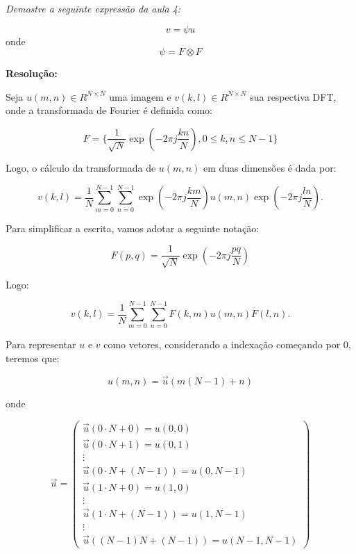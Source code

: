 \documentclass[]{abntex2}
\begin{document}
\textit{Demostre a seguinte expressão da aula 4:}

\begin{equation*}
	v = \psi u
\end{equation*}
onde
\begin{equation*}
	\psi = F \otimes F
\end{equation*}

\textbf{Resolução:}

Seja $u(m,n)\in R^{N \times N}$ uma imagem e $v(k,l)\in R^{N \times N}$ sua respectiva DFT, onde a transformada de Fourier é definida como:

\begin{equation*}
	F=\{\dfrac{1}{\sqrt{N}}\exp(-2\pi j \dfrac{kn}{N}), 0 \leq k,n \leq N-1\}
\end{equation*}

Logo, o cálculo da transformada de $u(m,n)$ em duas dimensões é dada por:

\begin{equation*}
	v(k,l) = \dfrac{1}{N} \sum_{m = 0}^{N-1} \sum_{n = 0}^{N-1} \exp(-2\pi j \dfrac{km}{N}) u(m,n)\exp(-2\pi j \dfrac{ln}{N}).
\end{equation*}

Para simplificar a escrita, vamos adotar a seguinte notação:

\begin{equation*}
	F(p,q) = \dfrac{1}{\sqrt{N}}\exp(-2\pi j \dfrac{pq}{N})
\end{equation*}

Logo:

\begin{equation*}
	v(k,l) = \dfrac{1}{N} \sum_{m = 0}^{N-1} \sum_{n = 0}^{N-1} F(k,m) u(m,n)F(l,n).
\end{equation*}

Para representar $u$ e $v$ como vetores, considerando a indexação começando por $0$, teremos que:

\begin{equation*}
	u(m,n) = \vec{u}(m(N-1)+n)
\end{equation*}

onde

\begin{equation*}
	\vec{u} = \begin{pmatrix}
		\vec{u}(0\cdot N+0) = u(0,0) \\
		\vec{u}(0\cdot N+1) = u(0,1) \\
		\vdots \\
		\vec{u}(0\cdot N+(N-1)) = u(0,N-1) \\
		\vec{u}(1\cdot N + 0) = u(1,0) \\
		\vdots \\
		\vec{u}(1\cdot N+(N-1)) = u(1,N-1)\\
		\vdots \\
		\vec{u}((N-1)N + (N-1)) = u(N-1,N-1)
		\end{pmatrix}
\end{equation*}
\end{document}
